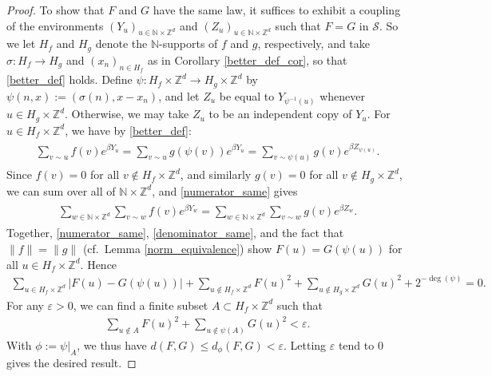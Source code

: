 \documentclass[11pt,reqno]{amsart}
\numberwithin{equation}{section}
\theoremstyle{definition}
\begin{document}
\begin{proof}
To show that $F$ and $G$ have the same law, it suffices to exhibit a coupling of the environments $(Y_u)_{u \in {\mathbb{N}} \times {\mathbb{Z}}^d}$ and $(Z_u)_{u \in {\mathbb{N}} \times {\mathbb{Z}}^d}$ such that $F = G$ in ${\mathcal{S}}$.
So we let $H_f$ and $H_g$ denote the ${\mathbb{N}}$-supports of $f$ and $g$, respectively, and take
$\sigma : H_f \to H_g$ and $(x_n)_{n \in H_f}$ as in Corollary \ref{better_def_cor}, so that \eqref{better_def} holds.
Define $\psi : H_f \times {\mathbb{Z}}^d \to H_g \times {\mathbb{Z}}^d$ by $\psi(n,x) := (\sigma(n),x-x_n)$, and
let $Z_u$ be equal to $Y_{\psi^{-1}(u)}$ whenever $u \in H_g \times {\mathbb{Z}}^d$.
Otherwise, we may take $Z_u$ to be an independent copy of $Y_u$.
For $u \in H_f \times {\mathbb{Z}}^d$, we have by \eqref{better_def}:
{\begin{align} \begin{split} {
\sum_{v \sim u} f(v)e^{\beta Y_u} = \sum_{v \sim u} g(\psi(v))e^{\beta Y_u}
= \sum_{v \sim \psi(u)} g(v)e^{\beta Z_{\psi(u)}}. \label{numerator_same}
} \end{split} \end{align}}
Since $f(v) = 0$ for all $v \notin H_f \times {\mathbb{Z}}^d$, and similarly $g(v) = 0$ for all $v \notin H_g \times {\mathbb{Z}}^d$, we can sum over all of ${\mathbb{N}} \times {\mathbb{Z}}^d$, and \eqref{numerator_same} gives
{\begin{align} \begin{split} {
\sum_{w \in {\mathbb{N}} \times {\mathbb{Z}}^d} \sum_{v \sim w} f(v) e^{\beta Y_w}
= \sum_{w \in {\mathbb{N}} \times {\mathbb{Z}}^d} \sum_{v \sim w} g(v) e^{\beta Z_w}. \label{denominator_same}
} \end{split} \end{align}}
Together, \eqref{numerator_same}, \eqref{denominator_same}, and the fact that $\|f\| = \|g\|$ (cf.~Lemma \ref{norm_equivalence}) show $F(u) = G(\psi(u))$ for all $u \in H_f \times {\mathbb{Z}}^d$.
Hence
{\begin{align*} {
\sum_{u \in H_f \times {\mathbb{Z}}^d} |F(u) - G(\psi(u))| + \sum_{u \notin H_f \times {\mathbb{Z}}^d} F(u)^2 + \sum_{u \notin H_g \times {\mathbb{Z}}^d} G(u)^2
+ 2^{-\deg(\psi)} = 0.
} \end{align*}}
For any ${\varepsilon} > 0$, we can find a finite subset $A \subset H_f \times {\mathbb{Z}}^d$ such that
{\begin{align*} {
\sum_{u \notin A} F(u)^2 + \sum_{u \notin \psi(A)} G(u)^2 < {\varepsilon}.
} \end{align*}}
With $\phi := \psi\rvert_{A}$, we thus have $d(F,G) \leq d_\phi(F,G) < {\varepsilon}$.
Letting ${\varepsilon}$ tend to 0 gives the desired result.
\end{proof}
\end{document}
